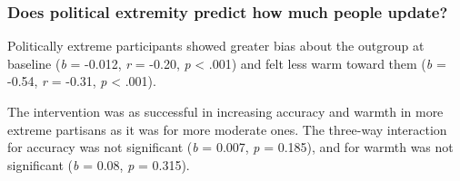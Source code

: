 \documentclass[
  11pt,
  oneside]{article}
\begin{document}
\subsubsection{Does political extremity predict how much people
update?}\label{does-political-extremity-predict-how-much-people-update}

Politically extreme participants showed greater bias about the outgroup
at baseline (\emph{b} = -0.012, \emph{r} = -0.20, \emph{p} \textless{}
.001) and felt less warm toward them (\emph{b} = -0.54, \emph{r} =
-0.31, \emph{p} \textless{} .001).

The intervention was as successful in increasing accuracy and warmth in
more extreme partisans as it was for more moderate ones. The three-way
interaction for accuracy was not significant (\emph{b} = 0.007, \emph{p}
= 0.185), and for warmth was not significant (\emph{b} = 0.08, \emph{p}
= 0.315).
\end{document}
